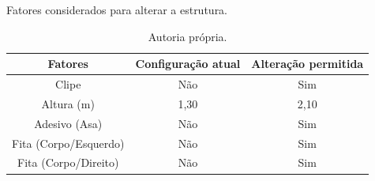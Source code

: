 \begin{table}[H]
  \caption{Fatores considerados para alterar a estrutura.}
  \centering
  \begin{tabular}{|c|c|c|}
  \hline
  \rowcolor[HTML]{EFEFEF} 
  \textbf{Fatores}      & \textbf{Configuração atual} & \textbf{Alteração permitida} \\ \hline
  Clipe                 & Não                         & Sim                          \\ \hline
  \rowcolor[HTML]{EFEFEF} 
  Altura (m)            & 1,30                        & 2,10                         \\ \hline
  Adesivo (Asa)         & Não                         & Sim                          \\ \hline
  \rowcolor[HTML]{EFEFEF} 
  Fita (Corpo/Esquerdo) & Não                         & Sim                          \\ \hline
  Fita (Corpo/Direito)  & Não                         & Sim                          \\ \hline
  \end{tabular}
  \caption*{Autoria própria.}
  \label{tab:fatores}
  \end{table}
